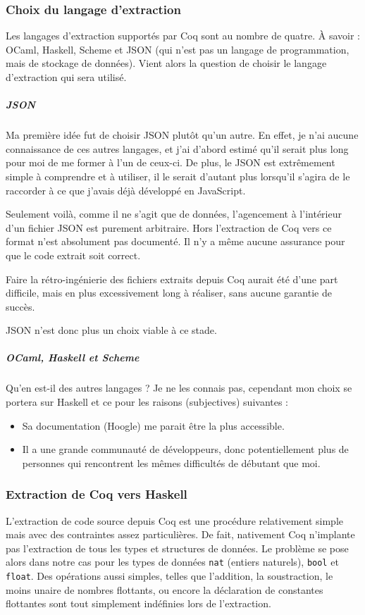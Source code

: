 \documentclass[]{article}
\begin{document}
\subsubsection{Choix du langage d'extraction}
Les langages d'extraction supportés par Coq sont au nombre de quatre. À savoir : OCaml, Haskell, Scheme et JSON (qui n'est pas un langage de programmation, mais de stockage de données). Vient alors la question de choisir le langage d'extraction qui sera utilisé.

\subparagraph*{JSON}
Ma première idée fut de choisir JSON plutôt qu'un autre. En effet, je n'ai aucune connaissance de ces autres langages, et j'ai d'abord estimé qu'il serait plus long pour moi de me former à l'un de ceux-ci. De plus, le JSON est extrêmement simple à comprendre et à utiliser, il le serait d'autant plus lorsqu'il s'agira de le raccorder à ce que j'avais déjà développé en JavaScript.

Seulement voilà, comme il ne s'agit que de données, l'agencement à l'intérieur d'un fichier JSON est purement arbitraire. Hors l'extraction de Coq vers ce format n'est absolument pas documenté. Il n'y a même aucune assurance pour que le code extrait soit correct.

Faire la rétro-ingénierie des fichiers extraits depuis Coq aurait été d'une part difficile, mais en plus excessivement long à réaliser, sans aucune garantie de succès.

JSON n'est donc plus un choix viable à ce stade.

\subparagraph*{OCaml, Haskell et Scheme}
Qu'en est-il des autres langages ? Je ne les connais pas, cependant mon choix se portera sur Haskell et ce pour les raisons (subjectives) suivantes :
\begin{itemize}
	\item Sa documentation (Hoogle) me parait être la plus accessible.
	\item Il a une grande communauté de développeurs, donc potentiellement plus de personnes qui rencontrent les mêmes difficultés de débutant que moi.
\end{itemize}

\subsubsection{Extraction de Coq vers Haskell}
L'extraction de code source depuis Coq est une procédure relativement simple mais avec des contraintes assez particulières. De fait, nativement Coq n'implante pas l'extraction de tous les types et structures de données. Le problème se pose alors dans notre cas pour les types de données \texttt{nat} (entiers naturels), \texttt{bool} et \texttt{float}. Des opérations aussi simples, telles que l'addition, la soustraction, le moins unaire de nombres flottants, ou encore la déclaration de constantes flottantes sont tout simplement indéfinies lors de l'extraction.
\end{document}
